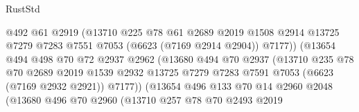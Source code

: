 \begin{lexlean}{RustStd}
\begin{coremodule}
                                  @492
                                  @61
                                  @2919
                                  (@13710
                                    @225
                                    @78
                                    @61
                                    @2689
                                    @2019
                                    @1508
                                    @2914
                                    @13725
                                    @7279
                                    @7283
                                    @7551
                                    @7053
                                    (@6623 (@7169 @2914 @2904))
                                    @7177))
                                (@13654
                                  @494
                                  @498
                                  @70
                                  @72
                                  @2937
                                  @2962
                                  (@13680
                                    @494
                                    @70
                                    @2937
                                    (@13710
                                      @235
                                      @78
                                      @70
                                      @2689
                                      @2019
                                      @1539
                                      @2932
                                      @13725
                                      @7279
                                      @7283
                                      @7591
                                      @7053
                                      (@6623 (@7169 @2932 @2921))
                                      @7177))
                                  (@13654
                                    @496
                                    @133
                                    @70
                                    @14
                                    @2960
                                    @2048
                                    (@13680
                                      @496
                                      @70
                                      @2960
                                      (@13710
                                        @257
                                        @78
                                        @70
                                        @2493
                                        @2019

\end{coremodule}
\end{lexlean}
